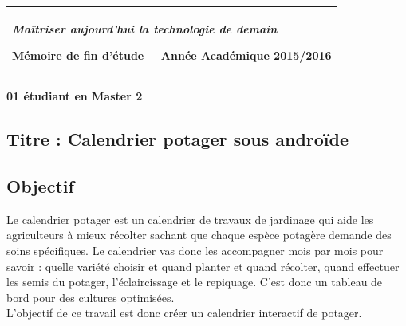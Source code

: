 \documentclass[10pt]{article}
\begin{document}

\begin{tabular}{C{\textwidth}}
	\begin{flushright}
	{\it Maîtriser aujourd'hui la technologie de demain}
	\end{flushright}
	\textbf{\Large Mémoire de fin d'étude $-$ Année Académique 2015/2016}\\\hline
\end{tabular}
\begin{flushright}
{\bf 01 étudiant en Master 2}
\end{flushright}

\begin{center}
\section*{Titre :  Calendrier potager sous androïde }
\end{center}

\subsection*{Objectif}
Le calendrier potager est un calendrier de travaux de jardinage qui  aide les agriculteurs à
mieux récolter sachant que chaque espèce potagère demande des soins spécifiques. Le calendrier
vas donc les accompagner mois par mois pour savoir : quelle variété choisir et quand planter et
quand récolter, quand effectuer les semis du potager, l'éclaircissage et le repiquage. C'est donc un
tableau de bord pour des cultures optimisées. \\
L’objectif de ce travail est donc créer un calendrier interactif de potager. \\
 
\end{document}
